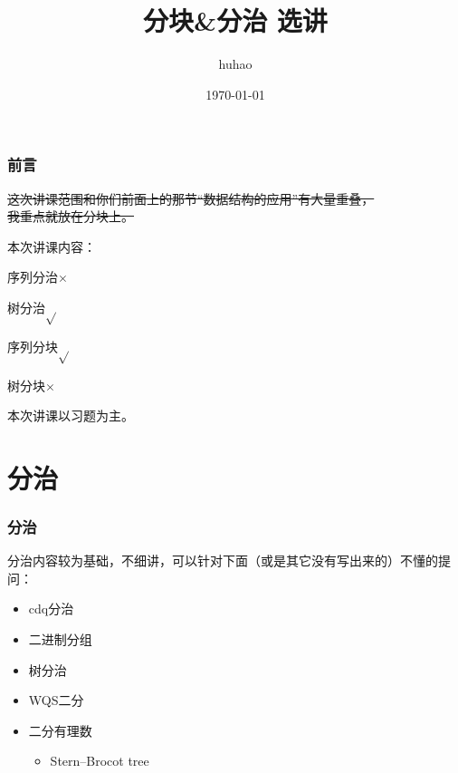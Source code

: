 \documentclass[10pt]{beamer}
\begin{document}
	\title{分块\&分治 选讲}
	\date{\today}
	\author{huhao}
	\maketitle
	\begin{frame}
		\frametitle{前言}
	
		\sout{这次讲课范围和你们前面上的那节“数据结构的应用”有大量重叠，\\我重点就放在分块上。}

		本次讲课内容：

		序列分治$\times$

		树分治$\sqrt{}$

		序列分块$\sqrt{}$

		树分块$\times$

		本次讲课以习题为主。
	
	\end{frame}
	\section{分治}
	\begin{frame}
		\frametitle{分治}
	
		分治内容较为基础，不细讲，可以针对下面（或是其它没有写出来的）不懂的提问：

		\begin{itemize}
			\item cdq分治
			\item 二进制分组
			\item 树分治
			\item WQS二分
			\item 二分有理数
			\begin{itemize}
				\item Stern–Brocot tree
			\end{itemize}
		\end{itemize}
	
	\end{frame}
\end{document}
